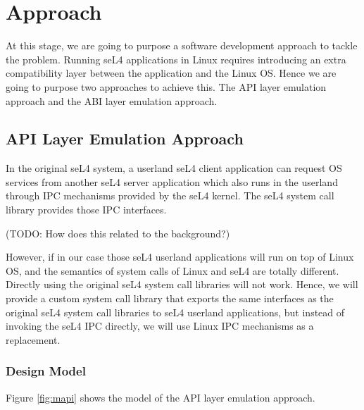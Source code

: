 \chapter{Approach}\label{ch:approaches}

At this stage, we are going to purpose a software development approach to tackle the problem. Running seL4 applications in Linux requires introducing an extra compatibility layer between the application and the Linux OS. Hence we are going to purpose two approaches to achieve this. The API layer emulation approach and the ABI layer emulation approach.  

\section{API Layer Emulation Approach}

In the original seL4 system, a userland seL4 client application can request OS services from another seL4 server application which also runs in the userland through IPC mechanisms provided by the seL4 kernel. The seL4 system call library provides those IPC interfaces. 

(TODO: How does this related to the background?)

However, if in our case those seL4 userland applications will run on top of Linux OS, and the semantics of system calls of Linux and seL4 are totally different. Directly using the original seL4 system call libraries will not work. Hence, we will provide a custom system call library that exports the same interfaces as the original seL4 system call libraries to seL4 userland applications, but instead of invoking the seL4 IPC directly, we will use Linux IPC mechanisms as a replacement.

\subsection{ Design Model}

Figure \ref{fig:mapi} shows the model of the API layer emulation approach. 


